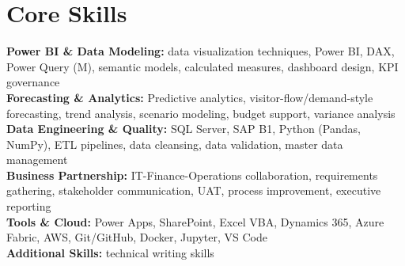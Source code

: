 \documentclass[10.5pt,letterpaper]{article}
\begin{document}
\section{Core Skills}
\noindent
\textbf{Power BI \& Data Modeling:} data visualization techniques, Power BI, DAX, Power Query (M), semantic models, calculated measures, dashboard design, KPI governance\\\textbf{Forecasting \& Analytics:} Predictive analytics, visitor-flow/demand-style forecasting, trend analysis, scenario modeling, budget support, variance analysis\\\textbf{Data Engineering \& Quality:} SQL Server, SAP B1, Python (Pandas, NumPy), ETL pipelines, data cleansing, data validation, master data management\\\textbf{Business Partnership:} IT-Finance-Operations collaboration, requirements gathering, stakeholder communication, UAT, process improvement, executive reporting\\\textbf{Tools \& Cloud:} Power Apps, SharePoint, Excel VBA, Dynamics 365, Azure Fabric, AWS, Git/GitHub, Docker, Jupyter, VS Code\\\textbf{Additional Skills:} technical writing skills
\end{document}
